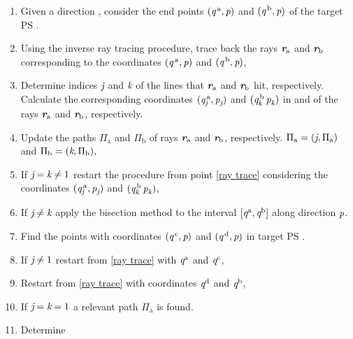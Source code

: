\begin{enumerate}
\item Given a direction , consider the end points $(\textit{q}^{\,\textrm{a}}, \textit{p})$ and $(\textit{q}^{\,\textrm{b}}, \textit{p})$ of the target PS .
\item \label{ray trace} Using the inverse ray tracing procedure, trace back the rays $\textit{\textbf{r}}_{\textrm{a}}$ and $\textit{\textbf{r}}_\textrm{b}$ corresponding to the coordinates  $(\textit{q}^{\,\textrm{a}}, \textit{p})$ and $ (\textit{q}^{\,\textrm{b}}, \textit{p})$,
\item Determine indices $\textit{j}$ and $\textit{k}$ of the lines that  $\textit{\textbf{r}}_{\textrm{a}}$ and $\textit{\textbf{r}}_{\textrm{b}}$  hit, respectively.\\
Calculate the corresponding coordinates $(\textit{q}^{\,\textrm{a}}_{\textit{j}}, \textit{p}_{\textit{j}})$ and $(\textit{q}^{\,\textrm{b}}_{\textit{k}}\, \textit{p}_{\textit{k}})$  in  and  of the rays $\textit{\textbf{r}}_{\textrm{a}}$ and $\textit{\textbf{r}}_{\textrm{b}}$, respectively.
\item Update the paths $\Pi_\textrm{a}$ and $\Pi_\textrm{b}$ of rays $\textit{\textbf{r}}_\textrm{a}$ and $\textit{\textbf{r}}_\textrm{b}$, respectively.  $\Pi_\textrm{a} = (\textit{j}, \Pi_{\textrm{a}})$ and $\Pi_\textrm{b} = (\textit{k}, \Pi_\textrm{b}),$
\item If $\textit{j}=\textit{k} \neq 1$ restart the procedure from point \ref{ray trace} considering the coordinates  $(\textit{q}^{\,\textrm{a}}_{\textit{j}}, \textit{p}_{\textit{j}})$ and $(\textit{q}^{\,\textrm{b}}_{\textit{k}}\, \textit{p}_{\textit{k}})$,
\item If $\textit{j}\neq\textit{k}$ apply the bisection method to the interval $[\textit{q}^{\textrm{a}}, \textit{q}^{\textrm{b}}]$ along direction $\textit{p}$.
\item Find the points with coordinates $(\textit{q}^{\,\textrm{c}}, \textit{p})$ and $(\textit{q}^{\,\textrm{d}}, \textit{p})$ in target PS . 
\item If $\textit{j}\neq 1$ restart from \ref{ray trace} with $\textit{q}^{\textrm{a}}$ and $\textit{q}^{\textrm{c}}$,
\item Restart from \ref{ray trace} with coordinates $\textit{q}^{\textrm{d}}$ and $\textit{q}^{\textrm{b}}$,
\item If $\textit{j}=\textit{k}= 1$ a relevant path $\Pi_{\textrm{a}}$ is found. 
\item Determine 
\begin{equation*}

\end{equation*}
\end{enumerate}
